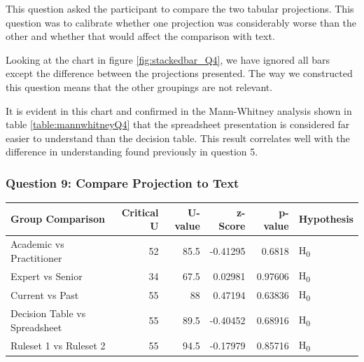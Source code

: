 This question asked the participant to compare the two tabular projections.  
This question was to calibrate whether one projection was considerably worse than the other and whether that would affect the comparison with text.

Looking at the chart in figure \ref{fig:stackedbar_Q4}, we have ignored all bars except the difference between the projections presented.
The way we constructed this question means that the other groupings are not relevant.

It is evident in this chart and confirmed in the Mann-Whitney analysis shown in table \ref{table:mannwhitneyQ4} that the spreadsheet presentation is considered far easier to understand than the decision table.
This result correlates well with the difference in understanding found previously in question 5.


\subsubsection{Question 9: Compare Projection to Text}
\noindent\begin{minipage}{\linewidth}
    \centering
    \label{fig:stackedbar_Q5}
    
    \begin{tabular}{ |l ||r |r |r | r|l | } 
        \hline
        Group Comparison                 & Critical U & U-value & z-Score  & p-value & Hypothesis         \\
        \hline
        \hline
        Academic vs Practitioner         & 52         & 85.5    & -0.41295 & 0.6818  & H\textsubscript{0} \\ 
        \hline
        Expert vs Senior                 & 34         & 67.5    & 0.02981  & 0.97606 & H\textsubscript{0} \\ 
        \hline
        Current vs Past                  & 55         & 88      & 0.47194  & 0.63836 & H\textsubscript{0} \\ 
        \hline
        Decision Table vs Spreadsheet    & 55         & 89.5    & -0.40452 & 0.68916 & H\textsubscript{0} \\ 
        \hline
        Ruleset 1 vs Ruleset 2           & 55         & 94.5    & -0.17979 & 0.85716 & H\textsubscript{0} \\ 
        \hline
    \end{tabular}
    \label{table:mannwhitneyQ5}
\end{minipage} 

